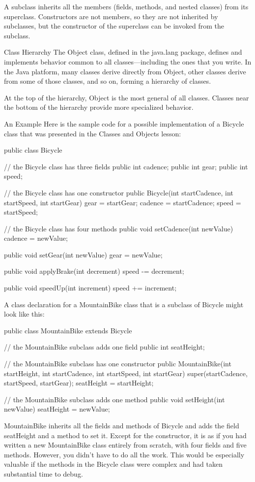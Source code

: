 A subclass inherits all the members (fields, methods, and nested classes) from its superclass. Constructors are not members, so they are not inherited by subclasses, but the constructor of the superclass can be invoked from the subclass.

Class Hierarchy
The Object class, defined in the java.lang package, defines and implements behavior common to all classes—including the ones that you write. In the Java platform, many classes derive directly from Object, other classes derive from some of those classes, and so on, forming a hierarchy of classes.


At the top of the hierarchy, Object is the most general of all classes. Classes near the bottom of the hierarchy provide more specialized behavior.

An Example
Here is the sample code for a possible implementation of a Bicycle class that was presented in the Classes and Objects lesson:

public class Bicycle {

    // the Bicycle class has three fields
    public int cadence;
    public int gear;
    public int speed;

    // the Bicycle class has one constructor
    public Bicycle(int startCadence, int startSpeed, int startGear) {
        gear = startGear;
        cadence = startCadence;
        speed = startSpeed;
    }

    // the Bicycle class has four methods
    public void setCadence(int newValue) {
        cadence = newValue;
    }

    public void setGear(int newValue) {
        gear = newValue;
    }

    public void applyBrake(int decrement) {
        speed -= decrement;
    }

    public void speedUp(int increment) {
        speed += increment;
    }

}
A class declaration for a MountainBike class that is a subclass of Bicycle might look like this:

public class MountainBike extends Bicycle {

    // the MountainBike subclass adds one field
    public int seatHeight;

    // the MountainBike subclass has one constructor
    public MountainBike(int startHeight,
                        int startCadence,
                        int startSpeed,
                        int startGear) {
        super(startCadence, startSpeed, startGear);
        seatHeight = startHeight;
    }

    // the MountainBike subclass adds one method
    public void setHeight(int newValue) {
        seatHeight = newValue;
    }
}
MountainBike inherits all the fields and methods of Bicycle and adds the field seatHeight and a method to set it. Except for the constructor, it is as if you had written a new MountainBike class entirely from scratch, with four fields and five methods. However, you didn't have to do all the work. This would be especially valuable if the methods in the Bicycle class were complex and had taken substantial time to debug.

